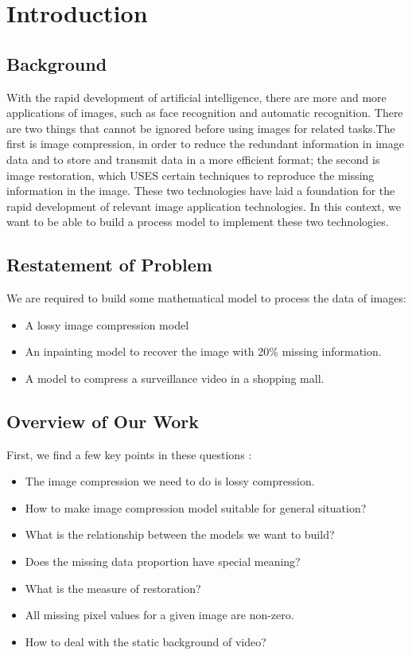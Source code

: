 \documentclass{mcmthesis}
\begin{document}
\section{Introduction}
\subsection{Background}

With the rapid development of artificial intelligence, there are more and more applications of images, such as face recognition and automatic recognition. There are two things that cannot be ignored before using images for related tasks.The first is image compression, in order to reduce the redundant information in image data and to store and transmit data in a more efficient format; the second is image restoration, which USES certain techniques to reproduce the missing information in the image.  These two technologies have laid a foundation for the rapid development of relevant image application technologies. In this context, we want to be able to build a process model to implement these two technologies.

\subsection{Restatement of Problem}

We are required to build some mathematical model to process the data of images:
\begin{itemize}
\item A lossy image compression model
\item An inpainting model to recover the image with 20\% missing information.
\item A model to compress a surveillance video in a shopping mall.
\end{itemize}

\subsection{Overview of Our Work}

First, we find a few key points in these questions :
\begin{itemize}
  \item The image compression we need to do is lossy compression.
  \item How to make image compression model suitable for general situation?
  \item What is the relationship between the models we want to build?
  \item Does the missing data proportion have special meaning?
  \item What is the measure of restoration?
  \item All missing pixel values for a given image are non-zero.
  \item How to deal with the static background of video?
\end{itemize}
\end{document}
